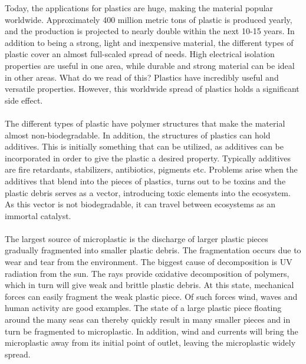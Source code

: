Today, the applications for plastics are huge, making the material popular worldwide. %
Approximately 400 million metric tons of plastic is produced yearly, and the production is projected to nearly double within the next 10-15 years. %
In addition to being a strong, light and inexpensive material, the different types of plastic cover an almost full-scaled spread of needs. High electrical isolation properties are useful in one area, while durable and strong material can be ideal in other areas. What do we read of this? Plastics have incredibly useful and versatile properties. However, this worldwide spread of plastics holds a significant side effect. 
\\\\
The different types of plastic have polymer structures that make the material almost non-biodegradable. In addition, the structures of plastics can hold additives. This is initially something that can be utilized, as additives can be incorporated in order to give the plastic a desired property. Typically additives are fire retardants, stabilizers, antibiotics, pigments etc. %
Problems arise when the additives that blend into the pieces of plastics, turns out to be toxins and the plastic debris serves as a vector, introducing toxic elements into the ecosystem. As this vector is not biodegradable, it can travel between ecosystems as an immortal catalyst.
\\\\
The largest source of microplastic is the discharge of larger plastic pieces gradually fragmented into smaller plastic debris. The fragmentation occurs due to wear and tear from the environment. The biggest cause of decomposition is UV radiation from the sun. The rays provide oxidative decomposition of polymers, which in turn will give weak and brittle plastic debris. At this state, mechanical forces can easily fragment the weak plastic piece. Of such forces wind, waves and human activity are good examples. The state of a large plastic piece floating around the many seas can thereby quickly result in many smaller pieces and in turn be fragmented to microplastic. In addition, wind and currents will bring the microplastic away from its initial point of outlet, leaving the microplastic widely spread. 
